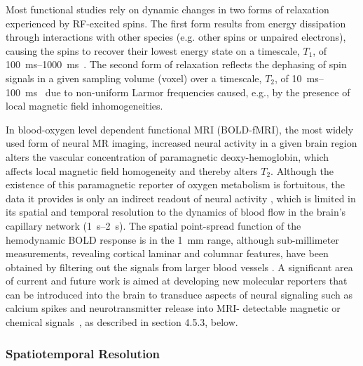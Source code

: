 Most functional studies rely on dynamic changes in two forms of relaxation experienced by RF-excited spins.
The first form results from energy dissipation through interactions with other species (e.g. other spins or unpaired electrons), causing the spins to recover their lowest energy state on a timescale, $T_1$, of \SIrange{100}{1000}{\milli\second}~\cite{rooney07}.
The second form of relaxation reflects the dephasing of spin signals in a given sampling volume (voxel) over a timescale, $T_2$, of \SIrange{10}{100}{\milli\second}~\cite{deichmann95} due to non-uniform Larmor frequencies caused, e.g., by the presence of local magnetic field inhomogeneities.

In blood-oxygen level dependent \cite{ogawa1990oxygenation} functional MRI (BOLD-fMRI), the most widely used form of neural MR imaging, increased neural activity in a given brain region alters the vascular concentration of paramagnetic deoxy-hemoglobin, which affects local magnetic field homogeneity and thereby alters $T_2$.
Although the existence of this paramagnetic reporter of oxygen metabolism is fortuitous, the data it provides is only an indirect readout of neural activity \cite{sirotin2009anticipatory, logothetis2008we, jukovskaya2011does}, which is limited in its spatial and temporal resolution to the dynamics of blood flow in the brain's capillary network (\SIrange{1}{2}{\second}). 
The spatial point-spread function of the hemodynamic BOLD response is in the \SI{1}{\milli\meter} range, although sub-millimeter measurements, revealing cortical laminar and columnar features, have been obtained by filtering out the signals from larger blood vessels \cite{bandettini2009functional}.
A significant area of current and future work is aimed at developing new molecular reporters that can be introduced into the brain to transduce aspects of neural signaling such as calcium spikes and neurotransmitter release into MRI- detectable magnetic or chemical signals~\cite{shapiro10,koretsky12,hsieh12}, as described in section 4.5.3, below.

\subsubsection{Spatiotemporal Resolution}

